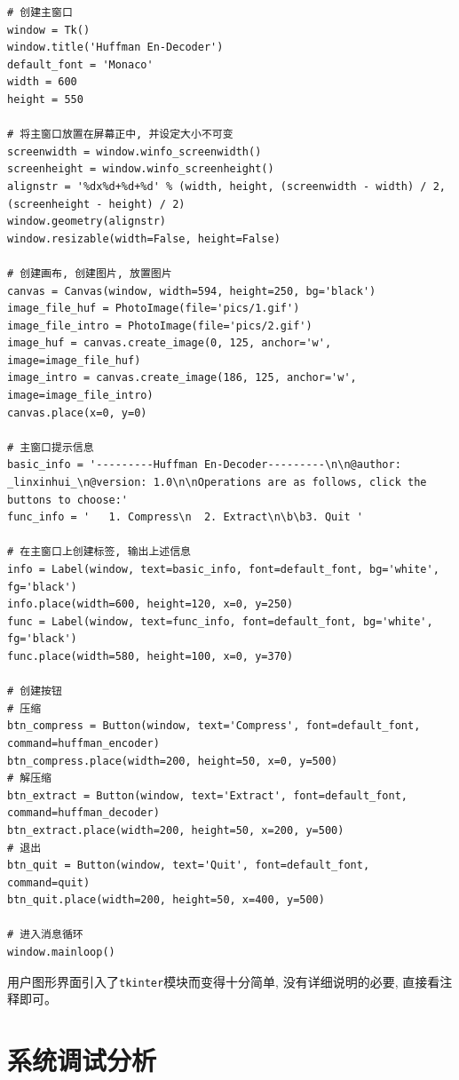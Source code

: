 \documentclass{ctexart}
\begin{document}
{\setmainfont{Courier New Bold}              
\begin{lstlisting}
# 创建主窗口
window = Tk()
window.title('Huffman En-Decoder')
default_font = 'Monaco'
width = 600
height = 550

# 将主窗口放置在屏幕正中, 并设定大小不可变
screenwidth = window.winfo_screenwidth()
screenheight = window.winfo_screenheight()
alignstr = '%dx%d+%d+%d' % (width, height, (screenwidth - width) / 2, (screenheight - height) / 2)
window.geometry(alignstr)
window.resizable(width=False, height=False)

# 创建画布, 创建图片, 放置图片
canvas = Canvas(window, width=594, height=250, bg='black')
image_file_huf = PhotoImage(file='pics/1.gif')
image_file_intro = PhotoImage(file='pics/2.gif')
image_huf = canvas.create_image(0, 125, anchor='w', image=image_file_huf)
image_intro = canvas.create_image(186, 125, anchor='w', image=image_file_intro)
canvas.place(x=0, y=0)

# 主窗口提示信息
basic_info = '---------Huffman En-Decoder---------\n\n@author: _linxinhui_\n@version: 1.0\n\nOperations are as follows, click the buttons to choose:'
func_info = '   1. Compress\n  2. Extract\n\b\b3. Quit '

# 在主窗口上创建标签, 输出上述信息
info = Label(window, text=basic_info, font=default_font, bg='white', fg='black')
info.place(width=600, height=120, x=0, y=250)
func = Label(window, text=func_info, font=default_font, bg='white', fg='black')
func.place(width=580, height=100, x=0, y=370)

# 创建按钮
# 压缩
btn_compress = Button(window, text='Compress', font=default_font, command=huffman_encoder)
btn_compress.place(width=200, height=50, x=0, y=500)
# 解压缩
btn_extract = Button(window, text='Extract', font=default_font, command=huffman_decoder)
btn_extract.place(width=200, height=50, x=200, y=500)
# 退出
btn_quit = Button(window, text='Quit', font=default_font, command=quit)
btn_quit.place(width=200, height=50, x=400, y=500)

# 进入消息循环
window.mainloop()
\end{lstlisting}}

用户图形界面引入了\texttt{tkinter}模块而变得十分简单, 没有详细说明的必要, 直接看注释即可。


\section{系统调试分析}\label{header-n412}
\end{document}
